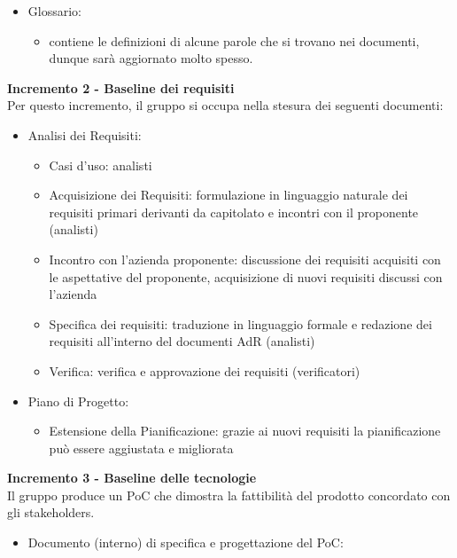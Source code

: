 {{\begin{itemize}
        \item Glossario: 
            \begin{itemize}
                \item contiene le definizioni di alcune parole che si trovano nei documenti, dunque sarà aggiornato molto spesso.
            \end{itemize}
    \end{itemize}
    \textbf{Incremento 2 - Baseline dei requisiti} \\
    Per questo incremento, il gruppo si occupa nella stesura dei seguenti documenti:
    \begin{itemize}
        \item Analisi dei Requisiti:
            \begin{itemize}
                \item Casi d’uso: analisti
                \item Acquisizione dei Requisiti: formulazione in linguaggio naturale dei requisiti primari derivanti da capitolato e incontri con il proponente (analisti)
                \item Incontro con l’azienda proponente: discussione dei requisiti acquisiti con le aspettative del proponente, acquisizione di nuovi requisiti discussi con l’azienda
                \item Specifica dei requisiti: traduzione in linguaggio formale e redazione dei requisiti all’interno del documenti AdR (analisti)
                \item Verifica: verifica e approvazione dei requisiti (verificatori)
            \end{itemize}
    \item Piano di Progetto: 
        \begin{itemize}
            \item Estensione della Pianificazione: grazie ai nuovi requisiti la pianificazione può essere aggiustata e migliorata
        \end{itemize} 
    \end{itemize}
    \textbf{Incremento 3 - Baseline delle tecnologie} \\
    Il gruppo produce un PoC che dimostra la fattibilità del prodotto concordato con gli stakeholders. \\
    \begin{itemize}
        \item Documento (interno) di specifica e progettazione del PoC:
            \begin{itemize}

\end{itemize}
\end{itemize}}}
